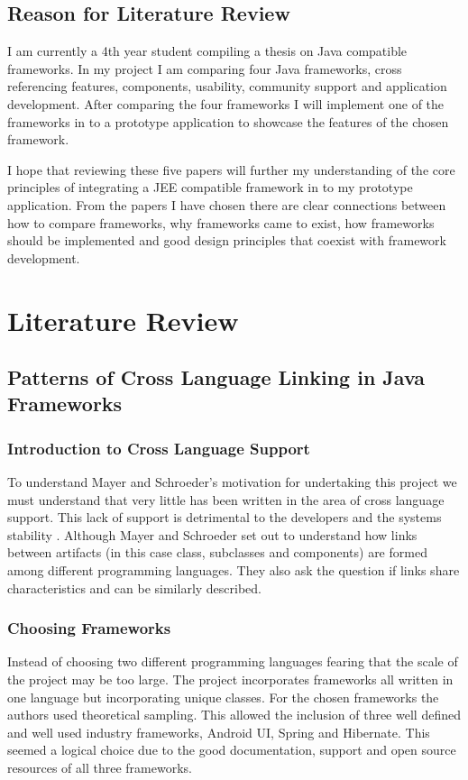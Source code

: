 	\subsection{Reason for Literature Review}
	I am currently a 4th year student compiling a thesis on Java compatible frameworks. In my project I am comparing four Java frameworks, cross referencing features, components, usability, community support and application development. After comparing the four frameworks I will implement one of the frameworks in to a prototype application to showcase the features of the chosen framework. 
	
	I hope that reviewing these five papers will further my understanding of the core principles of integrating a JEE compatible framework in to my prototype application. From the papers I have chosen there are clear connections between how to compare frameworks, why frameworks came to exist, how frameworks should be implemented and good design principles that coexist with framework development.
	
	\newpage
	
	
	\section{Literature Review}
	
	\subsection{Patterns of Cross Language Linking in Java Frameworks}
	
	\subsubsection{Introduction to Cross Language Support}
	To understand Mayer and Schroeder’s motivation for undertaking this project we must understand that very little has been written in the area of cross language support. This lack of support is detrimental to the developers and the systems stability \cite{crosslanguagecodeanalysis}\cite{tamingofconfusion}. Although Mayer and Schroeder set out to understand how links between artifacts (in this case class, subclasses and components) are formed among different programming languages. They also ask the question if links share characteristics and can be similarly described.
	
	\subsubsection{Choosing Frameworks}
	Instead of choosing two different programming languages fearing that the scale of the project may be too large. The project incorporates frameworks all written in one language but incorporating unique classes. For the chosen frameworks the authors used theoretical sampling. This allowed the inclusion of three well defined and well used industry frameworks, Android UI, Spring and Hibernate. This seemed a logical choice due to the good documentation, support and open source resources of all three frameworks.
	
